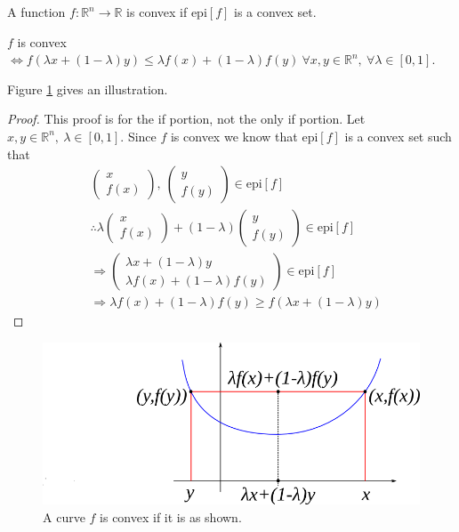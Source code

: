 \begin{definition}
A function $f:\mathbb{R}^n\to\mathbb{R}$ is convex if $\text{epi}[f]$ is a convex set.
\end{definition}

\begin{theorem}
$f$ is convex $\Leftrightarrow f(\lambda x + (1-\lambda)y)\leq \lambda f(x) + (1-\lambda)f(y) ~\forall x,y\in\mathbb{R}^n, ~\forall \lambda\in[0,1]$.
\end{theorem}
Figure \ref{fig:05convexGeoProof} gives an illustration.
\begin{proof}
This proof is for the if portion, not the only if portion. Let $x,y\in\mathbb{R}^n, ~\lambda\in[0,1]$. Since $f$ is convex we know that $\text{epi}[f]$ is a convex set such that
\begin{align*}
&\left(\begin{array}{c} x \\ f(x) \end{array}\right), ~\left(\begin{array}{c} y \\ f(y) \end{array}\right) \in \text{epi}[f] \\
&\therefore \lambda\left(\begin{array}{c} x \\ f(x) \end{array}\right) + (1-\lambda)\left(\begin{array}{c} y \\ f(y) \end{array}\right) \in \text{epi}[f] \\
&\Rightarrow \left(\begin{array}{c} \lambda x+(1-\lambda)y \\ \lambda f(x) + (1-\lambda)f(y) \end{array}\right) \in \text{epi}[f] \\
&\Rightarrow \lambda f(x) + (1-\lambda)f(y) \geq f(\lambda x + (1-\lambda)y)
\end{align*}
\end{proof}

\begin{figure}[ht!]
	\centering
	\includegraphics[width=.5\textwidth]{images/05convexGeoProof}
	\caption{A curve $f$ is convex if it is as shown.}
	\label{fig:05convexGeoProof}
\end{figure}

